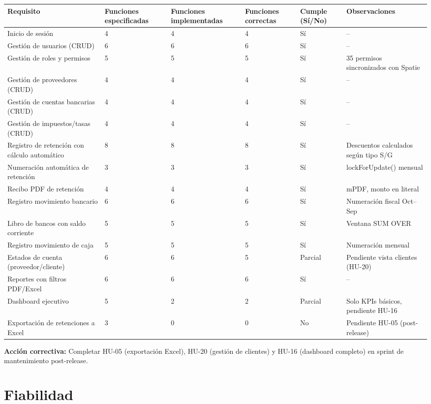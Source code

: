 \documentclass[stu]{apa7}
\begin{document}
\begin{longtable}{|L{3.5cm}|C{2.5cm}|C{2.5cm}|C{2.5cm}|C{1.5cm}|L{3cm}|}
\hline
{}
\textbf{Requisito} & \textbf{Funciones especificadas} & \textbf{Funciones implementadas} & \textbf{Funciones correctas} & \textbf{Cumple (Sí/No)} & \textbf{Observaciones} \\
\hline
Inicio de sesión & 4 & 4 & 4 & Sí & -- \\
\hline
Gestión de usuarios (CRUD) & 6 & 6 & 6 & Sí & -- \\
\hline
Gestión de roles y permisos & 5 & 5 & 5 & Sí & 35 permisos sincronizados con Spatie \\
\hline
Gestión de proveedores (CRUD) & 4 & 4 & 4 & Sí & -- \\
\hline
Gestión de cuentas bancarias (CRUD) & 4 & 4 & 4 & Sí & -- \\
\hline
Gestión de impuestos/tasas (CRUD) & 4 & 4 & 4 & Sí & -- \\
\hline
Registro de retención con cálculo automático & 8 & 8 & 8 & Sí & Descuentos calculados según tipo S/G \\
\hline
Numeración automática de retención & 3 & 3 & 3 & Sí & lockForUpdate() mensual \\
\hline
Recibo PDF de retención & 4 & 4 & 4 & Sí & mPDF, monto en literal \\
\hline
Registro movimiento bancario & 6 & 6 & 6 & Sí & Numeración fiscal Oct--Sep \\
\hline
Libro de bancos con saldo corriente & 5 & 5 & 5 & Sí & Ventana SUM OVER \\
\hline
Registro movimiento de caja & 5 & 5 & 5 & Sí & Numeración mensual \\
\hline
Estados de cuenta (proveedor/cliente) & 6 & 6 & 5 & Parcial & Pendiente vista clientes (HU-20) \\
\hline
Reportes con filtros PDF/Excel & 6 & 6 & 6 & Sí & -- \\
\hline
Dashboard ejecutivo & 5 & 2 & 2 & Parcial & Solo KPIs básicos, pendiente HU-16 \\
\hline
Exportación de retenciones a Excel & 3 & 0 & 0 & No & Pendiente HU-05 (post-release) \\
\hline
\end{longtable}

\textbf{Acción correctiva:} Completar HU-05 (exportación Excel), HU-20 (gestión de clientes) y HU-16 (dashboard completo) en sprint de mantenimiento post-release.

\section{Fiabilidad}
\end{document}
